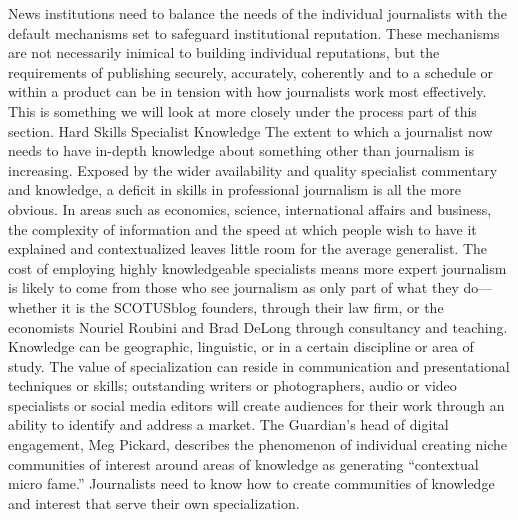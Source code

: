 News institutions need to balance the needs of the individual journalists with the
default mechanisms set to safeguard institutional reputation. These mechanisms
are not necessarily inimical to building individual reputations, but the requirements
of publishing securely, accurately, coherently and to a schedule or within a
product can be in tension with how journalists work most effectively.
This is something we will look at more closely under the process part of
this section.
Hard Skills
Specialist Knowledge
The extent to which a journalist now needs to have in-depth knowledge about
something other than journalism is increasing. Exposed by the wider availability
and quality specialist commentary and knowledge, a deficit in skills in professional
journalism is all the more obvious. In areas such as economics, science,
international affairs and business, the complexity of information and the speed at
which people wish to have it explained and contextualized leaves little room for
the average generalist.
The cost of employing highly knowledgeable specialists means more expert
journalism is likely to come from those who see journalism as only part of what
they do—whether it is the SCOTUSblog founders, through their law firm, or
the economists Nouriel Roubini and Brad DeLong through consultancy and
teaching. Knowledge can be geographic, linguistic, or in a certain discipline or
area of study.
The value of specialization can reside in communication and presentational techniques
or skills; outstanding writers or photographers, audio or video specialists
or social media editors will create audiences for their work through an ability to
identify and address a market.
The Guardian’s head of digital engagement, Meg Pickard, describes the phenomenon
of individual creating niche communities of interest around areas
of knowledge as generating ``contextual micro fame.'' Journalists need to
know how to create communities of knowledge and interest that serve their
own specialization.

